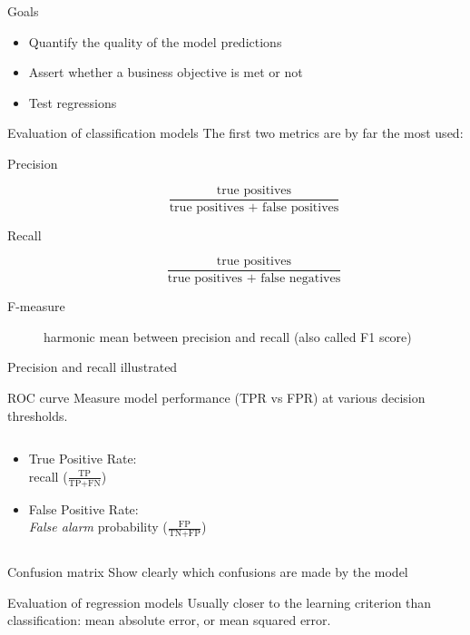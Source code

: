 \begin{frame}{Goals}
  \begin{itemize}[<+->]
    \item Quantify the quality of the model predictions
    \item Assert whether a business objective is met or not
    \item Test regressions
  \end{itemize}
\end{frame}

\begin{frame}{Evaluation of classification models}
  The first two metrics are by far the most used:
  \begin{description}
  \item[Precision]
    \[
    \frac{\text{true positives}}{\text{true positives + false positives}}
    \]
  \item[Recall]
    \[
    \frac{\text{true positives}}{\text{true positives + false negatives}}
  \]
  \item[F-measure] harmonic mean between precision and recall (also called F1 score)
  \end{description}
\end{frame}

\begin{frame}{Precision and recall illustrated}
\end{frame}

\begin{frame}{ROC curve}
  Measure model performance (TPR vs FPR) at various decision thresholds.
  \begin{columns}
    \begin{column}{.48\textwidth}
    \begin{itemize}
      \item True Positive Rate:\\recall ($\frac{\text{TP}}{\text{TP} + \text{FN}}$)
      \item False Positive Rate:\\\emph{False alarm} probability ($\frac{\text{FP}}{\text{TN} + \text{FP}}$)
    \end{itemize}
    \end{column}
    \begin{column}{.52\textwidth}
    \end{column}
  \end{columns}
\end{frame}

\begin{frame}{Confusion matrix}
  Show clearly which confusions are made by the model
\end{frame}

\begin{frame}{Evaluation of regression models}
  Usually closer to the learning criterion than classification: mean absolute error, or mean squared error.
\end{frame}
